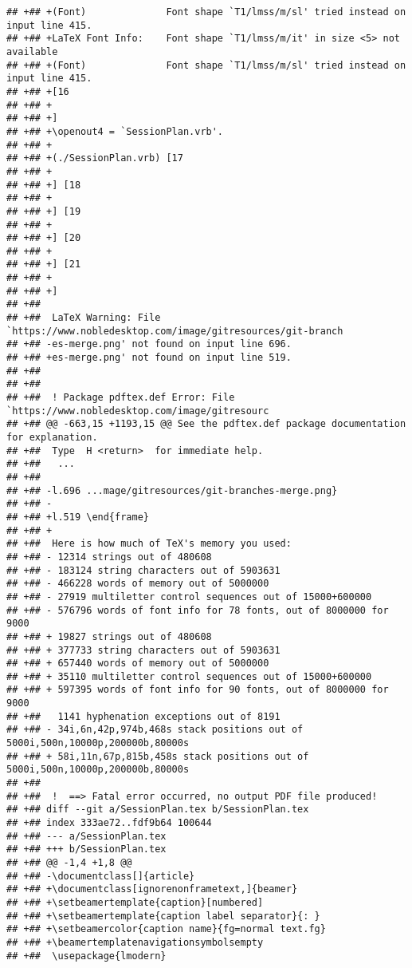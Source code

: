 \documentclass[ignorenonframetext,]{beamer}
\begin{document}
\begin{verbatim}
## +## +(Font)              Font shape `T1/lmss/m/sl' tried instead on input line 415.
## +## +LaTeX Font Info:    Font shape `T1/lmss/m/it' in size <5> not available
## +## +(Font)              Font shape `T1/lmss/m/sl' tried instead on input line 415.
## +## +[16
## +## +
## +## +]
## +## +\openout4 = `SessionPlan.vrb'.
## +## +
## +## +(./SessionPlan.vrb) [17
## +## +
## +## +] [18
## +## +
## +## +] [19
## +## +
## +## +] [20
## +## +
## +## +] [21
## +## +
## +## +]
## +##  
## +##  LaTeX Warning: File `https://www.nobledesktop.com/image/gitresources/git-branch
## +## -es-merge.png' not found on input line 696.
## +## +es-merge.png' not found on input line 519.
## +##  
## +##  
## +##  ! Package pdftex.def Error: File `https://www.nobledesktop.com/image/gitresourc
## +## @@ -663,15 +1193,15 @@ See the pdftex.def package documentation for explanation.
## +##  Type  H <return>  for immediate help.
## +##   ...                                              
## +##                                                    
## +## -l.696 ...mage/gitresources/git-branches-merge.png}
## +## -                                                   
## +## +l.519 \end{frame}
## +## +                  
## +##  Here is how much of TeX's memory you used:
## +## - 12314 strings out of 480608
## +## - 183124 string characters out of 5903631
## +## - 466228 words of memory out of 5000000
## +## - 27919 multiletter control sequences out of 15000+600000
## +## - 576796 words of font info for 78 fonts, out of 8000000 for 9000
## +## + 19827 strings out of 480608
## +## + 377733 string characters out of 5903631
## +## + 657440 words of memory out of 5000000
## +## + 35110 multiletter control sequences out of 15000+600000
## +## + 597395 words of font info for 90 fonts, out of 8000000 for 9000
## +##   1141 hyphenation exceptions out of 8191
## +## - 34i,6n,42p,974b,468s stack positions out of 5000i,500n,10000p,200000b,80000s
## +## + 58i,11n,67p,815b,458s stack positions out of 5000i,500n,10000p,200000b,80000s
## +##  
## +##  !  ==> Fatal error occurred, no output PDF file produced!
## +## diff --git a/SessionPlan.tex b/SessionPlan.tex
## +## index 333ae72..fdf9b64 100644
## +## --- a/SessionPlan.tex
## +## +++ b/SessionPlan.tex
## +## @@ -1,4 +1,8 @@
## +## -\documentclass[]{article}
## +## +\documentclass[ignorenonframetext,]{beamer}
## +## +\setbeamertemplate{caption}[numbered]
## +## +\setbeamertemplate{caption label separator}{: }
## +## +\setbeamercolor{caption name}{fg=normal text.fg}
## +## +\beamertemplatenavigationsymbolsempty
## +##  \usepackage{lmodern}

\end{verbatim}
\end{document}
